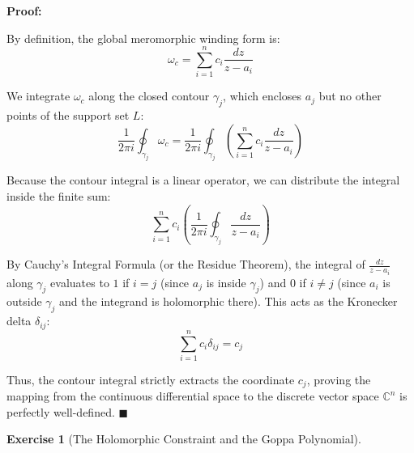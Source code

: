 \documentclass[11pt]{article}
\newtheorem{problem}{Exercise}
\begin{document}
	\begin{mdframed}[backgroundcolor=gray!5, linecolor=gray!50, linewidth=1pt]
		\textbf{Proof:}
		
		By definition, the global meromorphic winding form is:
		$$ \omega_c = \sum_{i=1}^n c_i \frac{dz}{z - a_i} $$
		
		We integrate $\omega_c$ along the closed contour $\gamma_j$, which encloses $a_j$ but no other points of the support set $L$:
		$$ \frac{1}{2\pi i} \oint_{\gamma_j} \omega_c = \frac{1}{2\pi i} \oint_{\gamma_j} \left( \sum_{i=1}^n c_i \frac{dz}{z - a_i} \right) $$
		
		Because the contour integral is a linear operator, we can distribute the integral inside the finite sum:
		$$ \sum_{i=1}^n c_i \left( \frac{1}{2\pi i} \oint_{\gamma_j} \frac{dz}{z - a_i} \right) $$
		
		By Cauchy's Integral Formula (or the Residue Theorem), the integral of $\frac{dz}{z - a_i}$ along $\gamma_j$ evaluates to $1$ if $i = j$ (since $a_j$ is inside $\gamma_j$) and $0$ if $i \neq j$ (since $a_i$ is outside $\gamma_j$ and the integrand is holomorphic there). This acts as the Kronecker delta $\delta_{ij}$:
		$$ \sum_{i=1}^n c_i \delta_{ij} = c_j $$
		
		Thus, the contour integral strictly extracts the coordinate $c_j$, proving the mapping from the continuous differential space to the discrete vector space $\mathbb{C}^n$ is perfectly well-defined. \hfill $\blacksquare$
	\end{mdframed}
	
	\vspace{1cm}
	
	\begin{problem}[The Holomorphic Constraint and the Goppa Polynomial]
	\end{problem}
	
\end{document}
